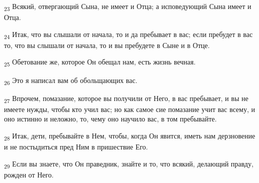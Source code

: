 \begin{tcolorbox}
\textsubscript{23} Всякий, отвергающий Сына, не имеет и Отца; а исповедующий Сына имеет и Отца.
\end{tcolorbox}
\begin{tcolorbox}
\textsubscript{24} Итак, что вы слышали от начала, то и да пребывает в вас; если пребудет в вас то, что вы слышали от начала, то и вы пребудете в Сыне и в Отце.
\end{tcolorbox}
\begin{tcolorbox}
\textsubscript{25} Обетование же, которое Он обещал нам, есть жизнь вечная.
\end{tcolorbox}
\begin{tcolorbox}
\textsubscript{26} Это я написал вам об обольщающих вас.
\end{tcolorbox}
\begin{tcolorbox}
\textsubscript{27} Впрочем, помазание, которое вы получили от Него, в вас пребывает, и вы не имеете нужды, чтобы кто учил вас; но как самое сие помазание учит вас всему, и оно истинно и неложно, то, чему оно научило вас, в том пребывайте.
\end{tcolorbox}
\begin{tcolorbox}
\textsubscript{28} Итак, дети, пребывайте в Нем, чтобы, когда Он явится, иметь нам дерзновение и не постыдиться пред Ним в пришествие Его.
\end{tcolorbox}
\begin{tcolorbox}
\textsubscript{29} Если вы знаете, что Он праведник, знайте и то, что всякий, делающий правду, рожден от Него.
\end{tcolorbox}
